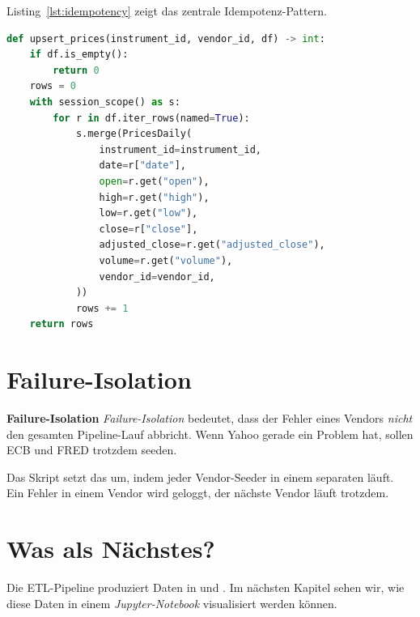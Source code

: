 Listing~\ref{lst:idempotency} zeigt das zentrale Idempotenz-Pattern.

\begin{lstlisting}[language=python, caption={Idempotenz-Pattern: SELECT vor INSERT},label=lst:idempotency]
def upsert_prices(instrument_id, vendor_id, df) -> int:
    if df.is_empty():
        return 0
    rows = 0
    with session_scope() as s:
        for r in df.iter_rows(named=True):
            s.merge(PricesDaily(
                instrument_id=instrument_id,
                date=r["date"],
                open=r.get("open"),
                high=r.get("high"),
                low=r.get("low"),
                close=r["close"],
                adjusted_close=r.get("adjusted_close"),
                volume=r.get("volume"),
                vendor_id=vendor_id,
            ))
            rows += 1
    return rows
\end{lstlisting}

\section{Failure-Isolation}

\begin{definition}
\textbf{Failure-Isolation}
\emph{Failure-Isolation} bedeutet, dass der Fehler eines Vendors
\emph{nicht} den gesamten Pipeline-Lauf abbricht. Wenn Yahoo
gerade ein Problem hat, sollen ECB und FRED trotzdem seeden.
\end{definition}

Das Skript  setzt das um, indem jeder
Vendor-Seeder in einem separaten  läuft. Ein
Fehler in einem Vendor wird geloggt, der nächste Vendor läuft trotzdem.

\section{Was als Nächstes?}

Die ETL-Pipeline produziert Daten in  und
. Im nächsten Kapitel sehen wir, wie diese
Daten in einem \emph{Jupyter-Notebook} visualisiert werden können.

